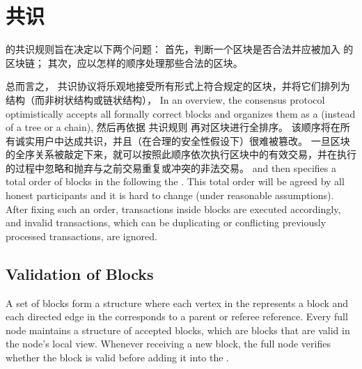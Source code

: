 

\section{共识}

{\name} 的共识规则旨在决定以下两个问题：
首先，判断一个区块是否合法并应被加入 {\name} 的区块链；
其次，应以怎样的顺序处理那些合法的区块。   

总而言之，{\name} 共识协议将乐观地接受所有形式上符合规定的区块，并将它们排列为\tg 结构（而非树状结构或链状结构），
In an overview, the \name consensus protocol optimistically accepts all formally correct blocks and organizes them as a \tg (instead of a tree or a chain), 
然后再依据 {\name} 共识规则 \cite{Conflux} 再对区块进行全排序。
该顺序将在所有诚实用户中达成共识，并且（在合理的安全性假设下）很难被篡改。
一旦区块的全序关系被敲定下来，就可以按照此顺序依次执行区块中的有效交易，并在执行的过程中忽略和抛弃与之前交易重复或冲突的非法交易。
and then specifies a total order of blocks in the \tg following the  .
This total order will be agreed by all honest participants and it is hard to change (under reasonable assumptions). 
After fixing such an order, transactions inside blocks are executed accordingly, and invalid transactions, which can be duplicating or conflicting previously processed transactions, are ignored.



\subsection{Validation of Blocks}
\label{sec:block validate}

A set of {\name} blocks form a \tg structure where each vertex in the \tg represents a {\name} block and each directed edge in the \tg corresponds to a parent or referee reference. 
Every full node maintains a \tg structure of accepted blocks, which are blocks that are valid in the node's local view.
Whenever receiving a new block, the full node verifies whether the block is valid before adding it into the \tg.

